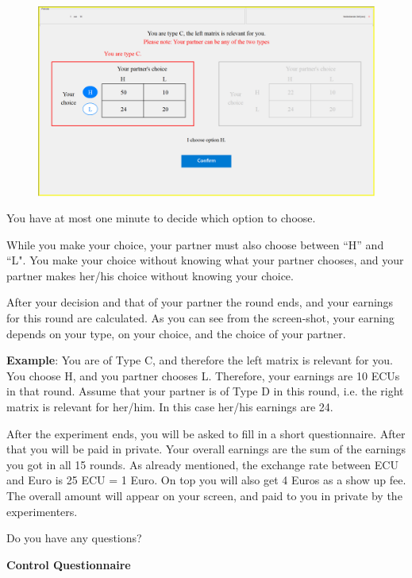 \documentclass[12pt]{article}
\theoremstyle{break}
\begin{document}
 \begin{figure}[h]
   \centering
     \includegraphics[width=.9\textwidth]{fig2-NC-instructions.png}
   \label{fig:fig2-NC-instructions}
 \end{figure}
 



You have at most one minute to decide which option to choose.

While you make your choice, your partner must also choose between ``H'' and ``L". You make your choice without knowing what your partner chooses, and your partner makes her/his choice without knowing your choice. 

After your decision and that of your partner the round ends, and your earnings for this round are calculated. As you can see from the screen-shot, your earning depends on your type, on your choice, and the choice of your partner. 

\textbf{Example}: You are of Type C, and therefore the left matrix is relevant for you. You choose H, and you partner chooses L. Therefore, your earnings are 10 ECUs in that round. Assume that your partner is of Type D in this round, i.e. the right matrix is relevant for her/him. In this case her/his earnings are 24. 

After the experiment ends, you will be asked to fill in a short questionnaire. After that you will be paid in private. Your overall earnings are the sum of the earnings you got in all 15 rounds. As already mentioned, the exchange rate between ECU and Euro is 25 ECU = 1 Euro. On top you will also get 4 Euros as a show up fee. The overall amount will appear on your screen, and paid to you in private by the experimenters. 

Do you have any questions? 




\textbf{Control Questionnaire}
\end{document}

